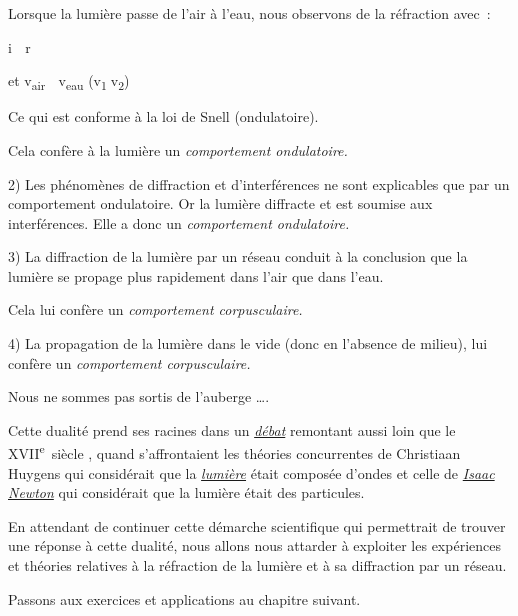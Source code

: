 Lorsque la lumière passe de l'air à l'eau, nous observons de la
réfraction avec~:

i  r

et v\textsubscript{air}  v\textsubscript{eau}
(v\textsubscript{1}v\textsubscript{2})

Ce qui est conforme à la loi de Snell (ondulatoire).

Cela confère à la lumière un \emph{comportement ondulatoire.}

2) Les phénomènes de diffraction et d'interférences ne sont explicables
que par un comportement ondulatoire. Or la lumière diffracte et est
soumise aux interférences. Elle a donc un \emph{comportement
ondulatoire.}

3) La diffraction de la lumière par un réseau conduit à la conclusion
que la lumière se propage plus rapidement dans l'air que dans l'eau.

Cela lui confère un \emph{comportement corpusculaire.}

4) La propagation de la lumière dans le vide (donc en l'absence de
milieu), lui confère un \emph{comportement corpusculaire.}

Nous ne sommes pas sortis de l'auberge \ldots.

Cette dualité prend ses racines dans un
\href{https://www.techno-science.net/definition/4206.html}{\emph{\emph{débat}}}
remontant aussi loin que le XVII\textsuperscript{e}~siècle , quand
s'affrontaient les théories concurrentes de Christiaan Huygens qui
considérait que la
\href{https://www.techno-science.net/glossaire-definition/Lumiere.html}{\emph{\emph{lumière}}}
était composée d'ondes et celle de
\href{https://www.techno-science.net/glossaire-definition/Isaac-Newton.html}{\emph{\emph{Isaac
Newton}}} qui considérait que la lumière était des particules.

En attendant de continuer cette démarche scientifique qui permettrait de
trouver une réponse à cette dualité, nous allons nous attarder à
exploiter les expériences et théories relatives à la réfraction de la
lumière et à sa diffraction par un réseau.

Passons aux exercices et applications au chapitre suivant.
